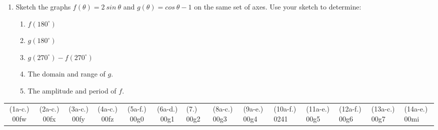 \begin{eocexercises}{}
\begin{enumerate}[itemsep=9pt, label=\textbf{\arabic*}. ]
  \item Sketch the graphs $f(\theta)=2~ sin~\theta$ and $g(\theta)=cos~\theta-1$ on the same set of axes. Use your sketch to determine:
    \begin{enumerate}[noitemsep, label=\textbf{(\alph*)} ]
    \item $f(180^{\circ})$
    \item $g(180^{\circ})$
    \item $g(270^{\circ}) -f(270^{\circ})$
    \item The domain and range of $g$.
    \item The amplitude and period of $f$.
    \end{enumerate}
  \end{enumerate}

\practiceinfo
\par 
\par \begin{tabular}[h]{cccccc}
(1a-c.) 00fw&  (2a-c.) 00fx&  (3a-c.) 00fy&  (4a-c.) 00fz&  (5a-f.) 00g0&  (6a-d.) 00g1&  (7.) 00g2&  (8a-c.) 00g3& (9a-e.) 00g4& (10a-f.) 0241 & (11a-e.) 00g5& (12a-f.) 00g6& (13a-c.) 00g7& (14a-e.) 00mi
\end{tabular}
\end{eocexercises}
